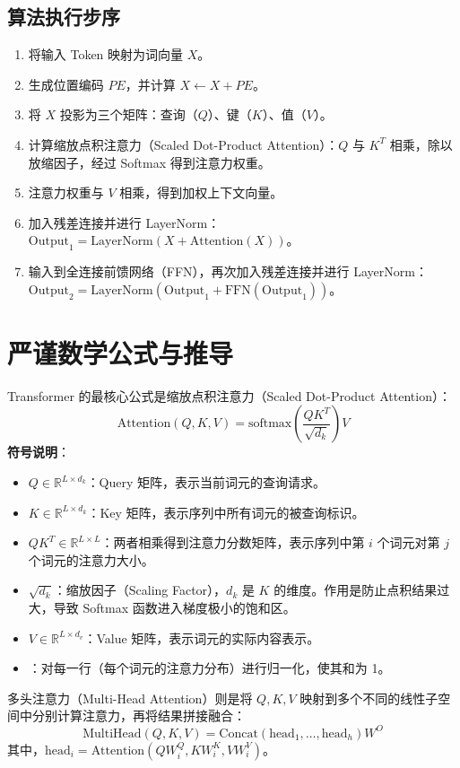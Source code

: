 \documentclass[12pt, a4paper]{article}
\begin{document}
\subsection{算法执行步序}
\begin{enumerate}
    \item 将输入 Token 映射为词向量 $X$。
    \item 生成位置编码 $PE$，并计算 $X \leftarrow X + PE$。
    \item 将 $X$ 投影为三个矩阵：查询（$Q$）、键（$K$）、值（$V$）。
    \item 计算缩放点积注意力（Scaled Dot-Product Attention）：$Q$ 与 $K^T$ 相乘，除以放缩因子，经过 Softmax 得到注意力权重。
    \item 注意力权重与 $V$ 相乘，得到加权上下文向量。
    \item 加入残差连接并进行 LayerNorm：$\text{Output}_1 = \text{LayerNorm}(X + \text{Attention}(X))$。
    \item 输入到全连接前馈网络（FFN），再次加入残差连接并进行 LayerNorm：$\text{Output}_2 = \text{LayerNorm}(\text{Output}_1 + \text{FFN}(\text{Output}_1))$。
\end{enumerate}

\section{严谨数学公式与推导}
Transformer 的最核心公式是缩放点积注意力（Scaled Dot-Product Attention）：
$$
\text{Attention}(Q,K,V) = \text{softmax}\left(\frac{QK^T}{\sqrt{d_k}}\right)V
$$
\textbf{符号说明}：
\begin{itemize}
    \item $Q \in \mathbb{R}^{L \times d_k}$：Query 矩阵，表示当前词元的查询请求。
    \item $K \in \mathbb{R}^{L \times d_k}$：Key 矩阵，表示序列中所有词元的被查询标识。
    \item $QK^T \in \mathbb{R}^{L \times L}$：两者相乘得到注意力分数矩阵，表示序列中第 $i$ 个词元对第 $j$ 个词元的注意力大小。
    \item $\sqrt{d_k}$：缩放因子（Scaling Factor），$d_k$ 是 $K$ 的维度。作用是防止点积结果过大，导致 Softmax 函数进入梯度极小的饱和区。
    \item $V \in \mathbb{R}^{L \times d_v}$：Value 矩阵，表示词元的实际内容表示。
    \item {}：对每一行（每个词元的注意力分布）进行归一化，使其和为 1。
\end{itemize}

多头注意力（Multi-Head Attention）则是将 $Q, K, V$ 映射到多个不同的线性子空间中分别计算注意力，再将结果拼接融合：
$$
\text{MultiHead}(Q,K,V) = \text{Concat}(\text{head}_1, \dots, \text{head}_h) W^O
$$
其中，$\text{head}_i = \text{Attention}(Q W_i^Q, K W_i^K, V W_i^V)$。
\end{document}
